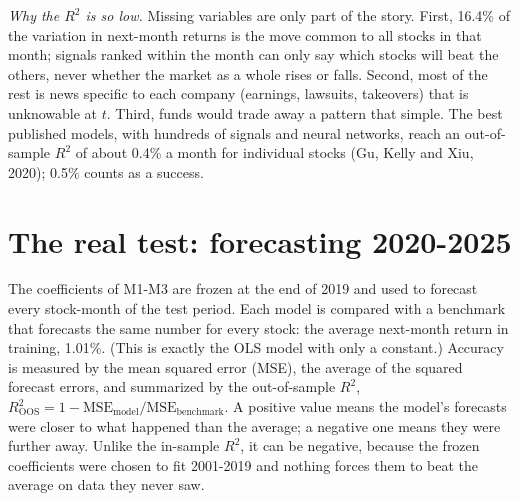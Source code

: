 \documentclass[10pt,a4paper]{article}
\begin{document}
\textit{Why the $R^2$ is so low.} Missing variables are only part of the story. First, 16.4\% of the variation in
next-month returns is the move common to all stocks in that month; signals ranked within the month can only say which
stocks will beat the others, never whether the market as a whole rises or falls. Second, most of the rest is news
specific to each company (earnings, lawsuits, takeovers) that is unknowable at $t$. Third, funds would trade away a pattern
that simple. The best published models, with hundreds of signals and neural networks, reach an out-of-sample $R^2$ of
about 0.4\% a month for individual stocks (Gu, Kelly and Xiu, 2020); 0.5\% counts as a success.

\section{The real test: forecasting 2020-2025}

The coefficients of M1-M3 are frozen at the end of 2019 and used to forecast every stock-month of the test period.
Each model is compared with a benchmark that forecasts the same number for every stock: the average next-month
return in training, 1.01\%. (This is exactly the OLS model with only a constant.) Accuracy is measured by the mean
squared error (MSE), the average of the squared forecast errors, and summarized by the out-of-sample $R^2$,
$R^2_{\text{OOS}} = 1-\text{MSE}_{\text{model}}/\text{MSE}_{\text{benchmark}}$. A positive value means the model's forecasts were closer to what happened than the average; a negative one means they
were further away. Unlike the in-sample $R^2$, it can be negative, because the frozen coefficients were chosen to fit
2001-2019 and nothing forces them to beat the average on data they never saw.
\end{document}

